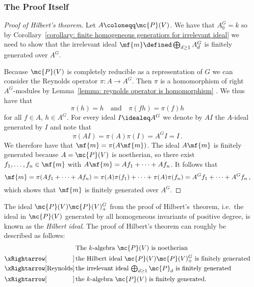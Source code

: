 \subsubsection{The Proof Itself}


\begin{proof}[Proof of Hilbert’s theorem]
  Let $A \coloneqq \mc{P}(V)$.
  We have that $A^G_0 = k$ so by Corollary~\ref{corollary: finite homogeneous generatiors for irrelevant ideal} we need to show that the irrelevant ideal $\mf{m} \defined \bigoplus_{d \geq 1} A^G_d$  is finitely generated over $A^G$.
  
  Because $\mc{P}(V)$ is completely reducible as a representation of $G$ we can consider the Reynolds operator $\pi \colon A \to A^G$.
  Then $\pi$ is a homomorphism of right $A^G$-modules by Lemma~\ref{lemma: reynolds operator is homomorphism} .
  We thus have that
  \[
      \pi(h)
    = h
    \quad\text{and}\quad
      \pi(fh)
    = \pi(f) h
  \]
  for all $f \in A$, $h \in A^G$.
  For every ideal $I \idealeq A^G$ we denote by $A I$ the $A$-ideal generated by $I$ and note that
  \begin{equation}
      \pi(A I)
    = \pi(A) \pi(I)
    = A^G I
    = I \,.
  \end{equation}
  We therefore have that $\mf{m} = \pi(A \mf{m})$.
  The ideal $A \mf{m}$ is finitely generated because $A = \mc{P}(V)$ is noetherian, so there exist $f_1, \dotsc, f_n \in \mf{m}$ with $A \mf{m} = A f_1 + \dotsb + A f_n$.
  It follows that
  \[
      \mf{m}
    = \pi(A f_1 + \dotsb + A f_n)
    = \pi(A) \pi(f_1) + \dotsb + \pi(A) \pi(f_n)
    = A^G f_1 + \dotsb + A^G f_n \,,
  \]
  which shows that $\mf{m}$ is finitely generated over $A^G$.
\end{proof}


\begin{remark}
  The ideal $\mc{P}(V) \mc{P}(V)^G_+$ from the proof of Hilbert’s~theorem, i.e.\ the ideal in $\mc{P}(V)$ generated by all homogeneous invariants of positive degree, is known as the \emph{Hilbert ideal}.
  The proof of Hilbert’s theorem can roughly be described as follows:
  \begin{align*}
    \phantom{\xRightarrow[\text{Reynolds}]{}}&\,
      \text{The $k$-algebra $\mc{P}(V)$ is noetherian}  \\
    \xRightarrow[\phantom{\text{Reynolds}}]{}&\,
      \text{the Hilbert ideal $\mc{P}(V) \mc{P}(V)^G_+$ is finitely generated}  \\
    \xRightarrow[\text{Reynolds}]{}&\,
      \text{the irrelevant ideal $\textstyle\bigoplus_{d \geq 1} \mc{P}_d$ is finitely generated} \\
    \xRightarrow[\phantom{\text{Reynolds}}]{}&\,
      \text{the $k$-algebra $\mc{P}(V)$ is finitely generated}.
  \end{align*}
\end{remark}




